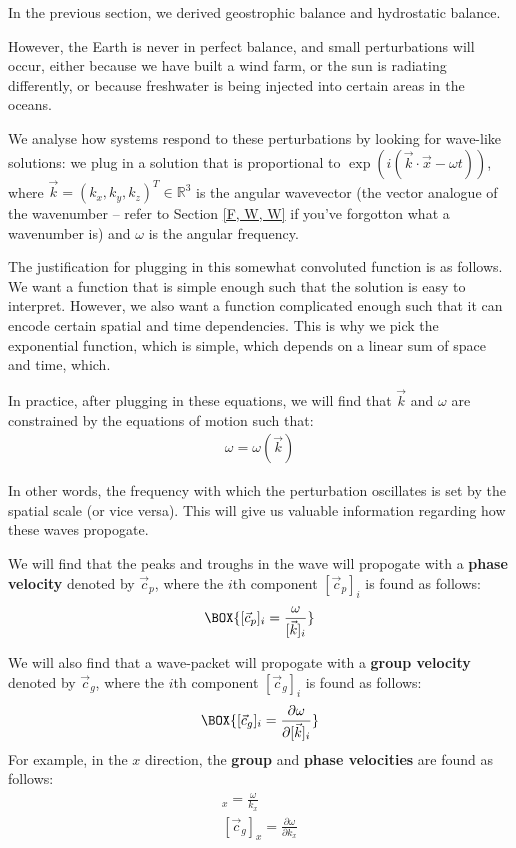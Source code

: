 In the previous section, we derived geostrophic balance and  hydrostatic balance. 

However, the Earth is never in perfect balance, and small perturbations will occur, either because we have built a wind farm, or the sun is radiating differently, or because freshwater is being injected into certain areas in the oceans.

We analyse how systems respond to these perturbations by looking for wave-like solutions: we plug in a solution that is proportional to $\exp(i(\vec{k}\cdot\vec{x}-\omega t))$, where $\vec{k}=(k_x,k_y,k_z)^T\in\mathbb{R}^3$ is the angular wavevector (the vector analogue of the wavenumber – refer to Section \ref{F, W, W} if you've forgotton what a wavenumber is) and $\omega$ is the angular frequency.

The justification for plugging in this somewhat convoluted function is as follows. We want a function that is simple enough such that the solution is easy to interpret. However, we also want a function complicated enough such that it can encode certain spatial and time dependencies. This is why we pick the exponential function, which is simple, which depends on a linear sum of space and time, which.

In practice, after plugging in these equations, we will find that $\vec{k}$ and $\omega$ are constrained by the equations of motion such that:
\begin{align*}
    \omega=\omega(\vec{k})
\end{align*}

In other words, the frequency with which the perturbation oscillates is set by the spatial scale (or vice versa). This will give us valuable information regarding how these waves propogate.

We will find that the peaks and troughs in the wave will propogate with a \textbf{phase velocity} denoted by $\vec{c}_p$, where the $i$th component $[\vec{c}_p]_i$ is found as follows:
\begin{align}
    \label{Phase Velocity}
    \BOX{[\vec{c}_p]_i=\frac{\omega}{[\vec{k}]_i}}
\end{align}

We will also find that a wave-packet will propogate with a \textbf{group velocity} denoted by $\vec{c}_g$, where the $i$th component $[\vec{c}_g]_i$ is found as follows:
\begin{align}
    \label{Group Velocity}
    \BOX{[\vec{c}_g]_i=\frac{\partial\omega}{\partial [\vec{k}]_i}}
\end{align}
For example, in the $x$ direction, the \textbf{group} and \textbf{phase velocities} are found as follows:
\begin{align*}
    [\vec{c}_p]_x=\frac{\omega}{k_x}\\
    [\vec{c}_g]_x=\frac{\partial\omega}{\partial k_x}
\end{align*}

